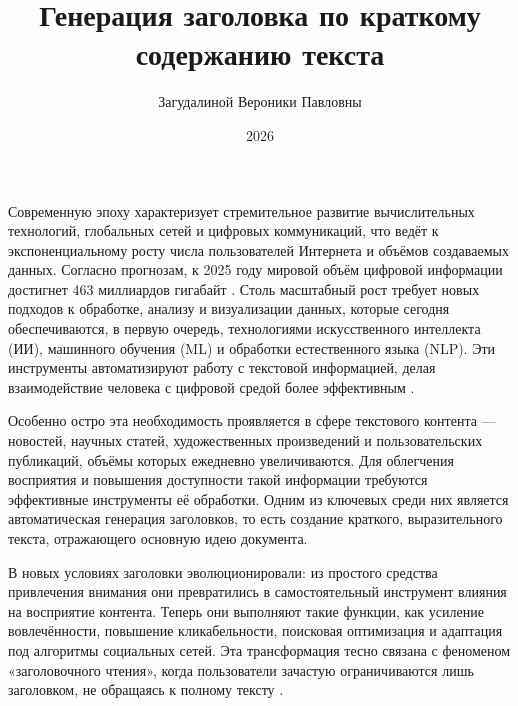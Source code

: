 \documentclass[coursework]{SCWorks}
\begin{document}
    \studentfemale



    \title{Генерация заголовка по краткому содержанию текста}


    \author{Загудалиной Вероники Павловны}






    \date{2026}

    \newpage

    \maketitle
    \secNumbering
    \tableofcontents


    \intro

    Современную эпоху характеризует стремительное развитие вычислительных технологий, глобальных сетей и цифровых коммуникаций,
    что ведёт к экспоненциальному росту числа пользователей Интернета и объёмов создаваемых данных.
    Согласно прогнозам, к 2025 году мировой объём цифровой информации достигнет 463 миллиардов гигабайт \cite{techjury2024}.
    Столь масштабный рост требует новых подходов к обработке, анализу и визуализации данных, которые сегодня обеспечиваются,
    в первую очередь, технологиями искусственного интеллекта (ИИ), машинного обучения (ML) и обработки естественного языка (NLP).
    Эти инструменты автоматизируют работу с текстовой информацией, делая взаимодействие человека с цифровой средой более эффективным \cite{shamigov_rugpt}.

    Особенно остро эта необходимость проявляется в сфере текстового контента — новостей, научных статей, художественных произведений
    и пользовательских публикаций, объёмы которых ежедневно увеличиваются.
    Для облегчения восприятия и повышения доступности такой информации требуются эффективные инструменты её обработки.
    Одним из ключевых среди них является автоматическая генерация заголовков, то есть создание краткого, выразительного текста,
    отражающего основную идею документа.

    В новых условиях заголовки эволюционировали: из простого средства привлечения внимания они превратились в самостоятельный
    инструмент влияния на восприятие контента.
    Теперь они выполняют такие функции, как усиление вовлечённости, повышение кликабельности, поисковая оптимизация и
    адаптация под алгоритмы социальных сетей.
    Эта трансформация тесно связана с феноменом «заголовочного чтения», когда пользователи зачастую ограничиваются лишь заголовком,
    не обращаясь к полному тексту \cite{boczkowski2018news}.
\end{document}
